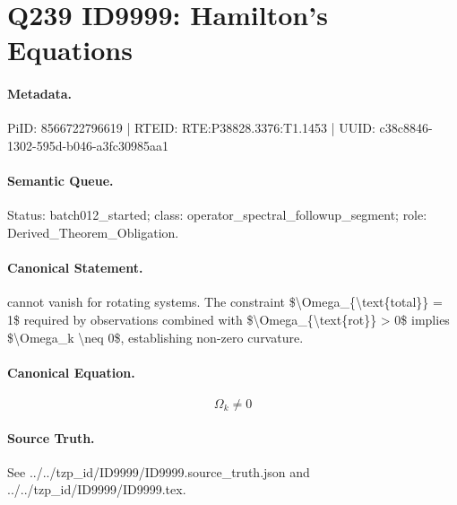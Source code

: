 \section*{Q239 ID9999: Hamilton’s Equations}
\paragraph{Metadata.}
PiID: 8566722796619 | RTEID: RTE:P38828.3376:T1.1453 | UUID: c38c8846-1302-595d-b046-a3fc30985aa1

\paragraph{Semantic Queue.}
Status: batch012\_started; class: operator\_spectral\_followup\_segment; role: Derived\_Theorem\_Obligation.

\paragraph{Canonical Statement.}
cannot vanish for rotating systems. The constraint \$\textbackslash{}Omega\_\{\textbackslash{}text\{total\}\} = 1\$ required by observations combined with \$\textbackslash{}Omega\_\{\textbackslash{}text\{rot\}\} > 0\$ implies \$\textbackslash{}Omega\_k \textbackslash{}neq 0\$, establishing non-zero curvature.

\paragraph{Canonical Equation.}
\[
\Omega_k \neq 0
\]

\paragraph{Source Truth.}
See ../../tzp\_id/ID9999/ID9999.source\_truth.json and ../../tzp\_id/ID9999/ID9999.tex.
